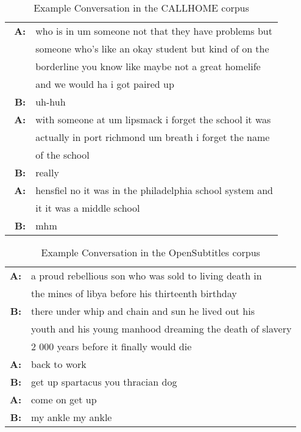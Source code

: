 \begin{table}[t!]
    \centering
    \small
    \caption{\small Example Conversation in the CALLHOME corpus}
    \begin{tabular}{rl}
      \hline
        \textbf{A:} & who is in um someone not that they have problems but\\
        		    & someone who's like an okay student but kind of on the\\
        			& borderline you know like maybe not a great homelife\\
        			& and we would ha i got paired up\\
		\textbf{B:} & uh-huh \\
\textbf{A:} & with someone at um lipsmack i forget the school it was\\
			& actually in port richmond um breath i forget the name\\
			& of the school\\\
\textbf{B:} & really\\
\textbf{A:} & hensfiel no it was in the philadelphia school system and\\ 
			& it it was a middle school\\
\textbf{B:} & mhm\\
      \hline
    \end{tabular}
    \label{table:phone_data}
\end{table}


\begin{table}[t!]
    \centering
    \small
    \caption{\small Example Conversation in the OpenSubtitles corpus}
    \begin{tabular}{rl}
      \hline
        \textbf{A:} & a proud rebellious son who was sold to living death in \\
                    & the mines of libya before his thirteenth birthday \\
        \textbf{B:} & there under whip and chain and sun he lived out his \\
                    & youth and his young manhood dreaming the death of slavery \\
                    & 2 000 years before it finally would die \\
\textbf{A:} & back to work\\
\textbf{B:} & get up spartacus you thracian dog\\
\textbf{A:} & come on get up\\ 
\textbf{B:} & my ankle my ankle\\
      \hline
    \end{tabular}
    \label{table:phone_data}
\end{table}